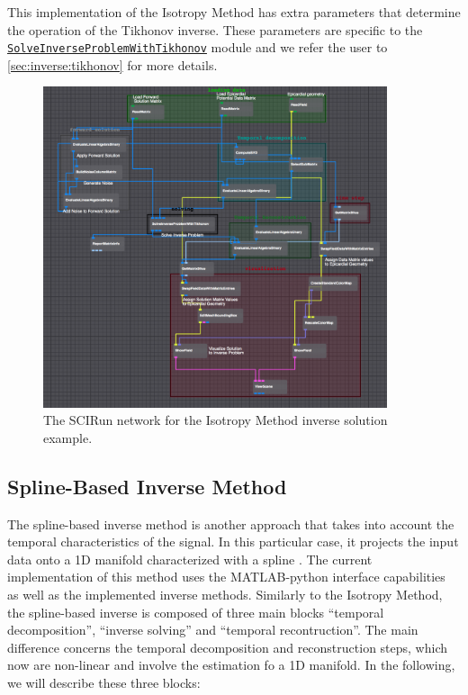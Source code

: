     This implementation of the Isotropy Method has extra parameters that determine the operation of the Tikhonov inverse. These parameters are specific to the \href{http://scirundocwiki.sci.utah.edu/SCIRunDocs/index.php/CIBC:Documentation:SCIRun:Reference:BioPSE:SolveInverseProblemWithTikhonov}{{\tt SolveInverseProblemWithTikhonov}} module and we refer the user to \autoref{sec:inverse:tikhonov} for more details.

   \begin{figure}
       \begin{center}
       \includegraphics[width=0.9\textwidth]{ECGToolkitGuide_figures/IsotropyMethod_networkExample.png}
       \caption{The SCIRun network for the Isotropy Method inverse solution example.}
       \label{fig:IsotropyMethod}
       \end{center}
   \end{figure}


\subsection{Spline-Based Inverse Method}

    The spline-based inverse method is another approach that takes into account the temporal characteristics of the signal. In this particular case, it projects the input data onto a 1D manifold characterized with a spline \cite{}.
    The current implementation of this method uses the MATLAB-python interface capabilities as well as the implemented inverse methods.
    Similarly to the Isotropy Method, the spline-based inverse is composed of three main blocks ``temporal decomposition'', ``inverse solving'' and ``temporal recontruction''.
    The main difference concerns the temporal decomposition and reconstruction steps, which now are non-linear and involve the estimation fo a 1D manifold.
    In the following, we will describe these three blocks:

